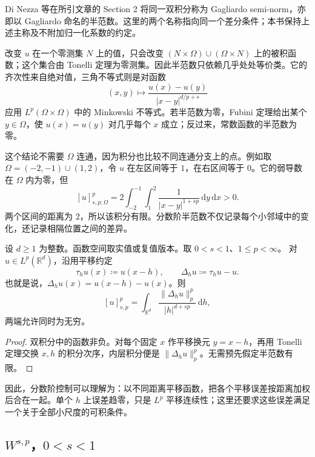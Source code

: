 Di Nezza 等在所引文章的 Section 2 将同一双积分称为 Gagliardo semi-norm，亦即以 Gagliardo 命名的半范数。这里的两个名称指向同一个差分条件；本书保持上述主称及不附加归一化系数的约定。

\ProseParagraphBreak

改变 \(u\) 在一个零测集 \(N\) 上的值，只会改变 \((N\times\Omega)\cup(\Omega\times N)\) 上的被积函数；这个集合由 Tonelli 定理为零测集。因此半范数只依赖几乎处处等价类。它的齐次性来自绝对值，三角不等式则是对函数
\[
 (x,y)\longmapsto\frac{u(x)-u(y)}{|x-y|^{d/p+s}}
\]
应用 \(L^p(\Omega\times\Omega)\) 中的 Minkowski 不等式。若半范数为零，Fubini 定理给出某个 \(y\in\Omega\)，使 \(u(x)=u(y)\) 对几乎每个 \(x\) 成立；反过来，常数函数的半范数为零。

\ProseParagraphBreak

这个结论不需要 \(\Omega\) 连通，因为积分也比较不同连通分支上的点。例如取 \(\Omega=(-2,-1)\cup(1,2)\)，令 \(u\) 在左区间等于 \(1\)，在右区间等于 \(0\)。它的弱导数在 \(\Omega\) 内为零，但
\[
 [u]_{s,p;\Omega}^p
 =2\int_{-2}^{-1}\int_1^2\frac{1}{|x-y|^{1+sp}}\,\mathrm dy\,\mathrm dx>0.
\]
两个区间的距离为 \(2\)，所以该积分有限。分数阶半范数不仅记录每个小邻域中的变化，还记录相隔位置之间的差异。

\begin{proposition}\label{b1:prop:fractional-difference-formula}
设 \(d\geq1\) 为整数。函数空间取实值或复值版本。取 \(0<s<1\)、\(1\leq p<\infty\)。
对 \(u\in L^p(\mathbb R^d)\)，沿用平移约定
\[
 \tau_hu(x)\coloneqq u(x-h),\qquad
 \Delta_hu\coloneqq\tau_hu-u.
\]
也就是说，\(\Delta_hu(x)=u(x-h)-u(x)\)。则
\begin{equation}\label{b1:eq:fractional-difference-formula}
 [u]_{s,p}^p
 =\int_{\mathbb R^d}\frac{\|\Delta_hu\|_p^p}{|h|^{d+sp}}\,\mathrm dh,
\end{equation}
两端允许同时为无穷。
\end{proposition}
\begin{proof}
双积分中的函数非负。对每个固定 \(x\) 作平移换元 \(y=x-h\)，再用 Tonelli 定理交换 \(x,h\) 的积分次序，内层积分便是 \(\|\Delta_hu\|_p^p\)。无需预先假定半范数有限。
\end{proof}

因此，分数阶控制可以理解为：以不同距离平移函数，把各个平移误差按距离加权后合在一起。单个 \(h\) 上误差趋零，只是 \(L^p\) 平移连续性；这里还要求这些误差满足一个关于全部小尺度的可积条件。

\subsection{\texorpdfstring{\(W^{s,p}\)}{Ws,p}，\texorpdfstring{\(0<s<1\)}{0<s<1}}
\label{b1:subsec:230202}

